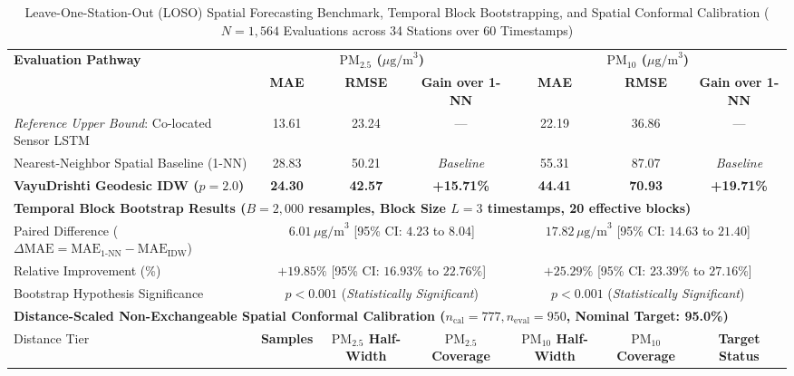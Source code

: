 \begin{table}[t]
\caption{Leave-One-Station-Out (LOSO) Spatial Forecasting Benchmark, Temporal Block Bootstrapping, and Spatial Conformal Calibration ($N = 1,564$ Evaluations across 34 Stations over 60 Timestamps)}
\label{tab:spatial_prediction}
\centering
\small
\begin{tabular}{lcccccc}
\toprule
\textbf{Evaluation Pathway} & \multicolumn{3}{c}{\textbf{$\text{PM}_{2.5}$ ($\mu\text{g/m}^3$)}} & \multicolumn{3}{c}{\textbf{$\text{PM}_{10}$ ($\mu\text{g/m}^3$)}} \\
\cmidrule(lr){2-4} \cmidrule(lr){5-7}
& \textbf{MAE} & \textbf{RMSE} & \textbf{Gain over 1-NN} & \textbf{MAE} & \textbf{RMSE} & \textbf{Gain over 1-NN} \\
\midrule
\textit{Reference Upper Bound}: Co-located Sensor LSTM & 13.61 & 23.24 & --- & 22.19 & 36.86 & --- \\
Nearest-Neighbor Spatial Baseline (1-NN) & 28.83 & 50.21 & \textit{Baseline} & 55.31 & 87.07 & \textit{Baseline} \\
\textbf{VayuDrishti Geodesic IDW ($p=2.0$)} & \textbf{24.30} & \textbf{42.57} & \textbf{+15.71\%} & \textbf{44.41} & \textbf{70.93} & \textbf{+19.71\%} \\
\midrule
\multicolumn{7}{l}{\textbf{Temporal Block Bootstrap Results ($B=2,000$ resamples, Block Size $L=3$ timestamps, 20 effective blocks)}} \\
\midrule
Paired Difference ($\Delta\text{MAE} = \text{MAE}_{\text{1-NN}} - \text{MAE}_{\text{IDW}}$) & \multicolumn{3}{c}{$6.01\,\mu\text{g/m}^3$ [95\% CI: $4.23$ to $8.04$]} & \multicolumn{3}{c}{$17.82\,\mu\text{g/m}^3$ [95\% CI: $14.63$ to $21.40$]} \\
Relative Improvement (\%) & \multicolumn{3}{c}{$+19.85\%$ [95\% CI: $16.93\%$ to $22.76\%$]} & \multicolumn{3}{c}{$+25.29\%$ [95\% CI: $23.39\%$ to $27.16\%$]} \\
Bootstrap Hypothesis Significance & \multicolumn{3}{c}{$p < 0.001$ (\textit{Statistically Significant})} & \multicolumn{3}{c}{$p < 0.001$ (\textit{Statistically Significant})} \\
\midrule
\multicolumn{7}{l}{\textbf{Distance-Scaled Non-Exchangeable Spatial Conformal Calibration ($n_{\text{cal}}=777, n_{\text{eval}}=950$, Nominal Target: 95.0\%)}} \\
\midrule
Distance Tier & \textbf{Samples} & \textbf{$\text{PM}_{2.5}$ Half-Width} & \textbf{$\text{PM}_{2.5}$ Coverage} & \textbf{$\text{PM}_{10}$ Half-Width} & \textbf{$\text{PM}_{10}$ Coverage} & \textbf{Target Status} \\

\end{tabular}
\end{table}
